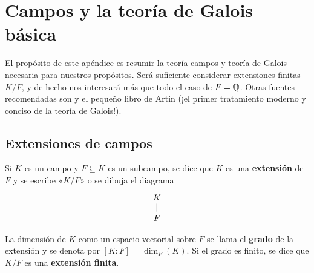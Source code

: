 \chapter{Campos y la teoría de Galois básica}
\label{ap:teoria-de-Galois}

El propósito de este apéndice es resumir la teoría campos y teoría de Galois
necesaria para nuestros propósitos. Será suficiente considerar extensiones
finitas $K/F$, y de hecho nos interesará más que todo el caso de
$F = \mathbb{Q}$. Otras fuentes recomendadas son \cite{Morandi-GTM167} y el pequeño
libro de Artin \cite{Artin-Galois} (¡el primer tratamiento moderno y conciso de
la teoría de Galois!).


\section{Extensiones de campos}

\begin{definicion}
  Si $K$ es un campo y $F \subseteq K$ es un subcampo, se dice que $K$ es una
  \textbf{extensión} de $F$ y se escribe «$K/F$» o se dibuja el diagrama
  \[ \begin{tikzcd}[row sep=1em]
    K\ar[-]{d} \\
    F
  \end{tikzcd} \]

  La dimensión de $K$ como un espacio vectorial sobre $F$ se llama el
  \textbf{grado} de la extensión y se denota por $[K : F] = \dim_F (K)$.
  Si el grado es finito, se dice que $K/F$ es una \textbf{extensión finita}.
\end{definicion}

